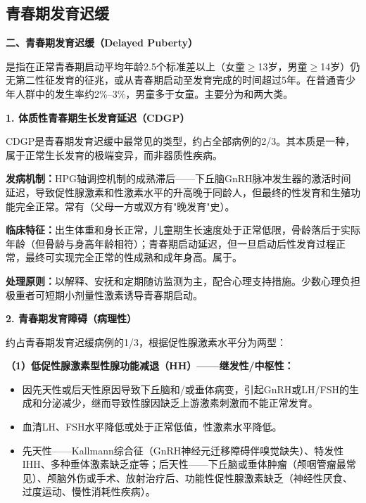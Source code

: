 \subsection{青春期发育迟缓}

\begin{defbox}
\textbf{二、青春期发育迟缓（Delayed Puberty）}

是指在正常青春期启动平均年龄2.5个标准差以上（女童$\geq$13岁，男童$\geq$14岁）仍无第二性征发育的征兆，或从青春期启动至发育完成的时间超过5年。在普通青少年人群中的发生率约2\%--3\%，男童多于女童。主要分为和两大类。
\end{defbox}

\begin{keybox}
\textbf{1. 体质性青春期生长发育延迟（CDGP）}

CDGP是青春期发育迟缓中最常见的类型，约占全部病例的2/3。其本质是一种，属于正常生长发育的极端变异，而非器质性疾病。

\textbf{发病机制：}HPG轴调控机制的成熟滞后——下丘脑GnRH脉冲发生器的激活时间延迟，导致促性腺激素和性激素水平的升高晚于同龄人，但最终的性发育和生殖功能完全正常。常有（父母一方或双方有"晚发育"史）。

\textbf{临床特征：}出生体重和身长正常，儿童期生长速度处于正常低限，骨龄落后于实际年龄（但骨龄与身高年龄相符）；青春期启动延迟，但一旦启动后性发育过程正常，最终可实现完全正常的性成熟和成年身高。属于。

\textbf{处理原则：}以解释、安抚和定期随访监测为主，配合心理支持措施。少数心理负担极重者可短期小剂量性激素诱导青春期启动。

\vspace{6pt}

\textbf{2. 青春期发育障碍（病理性）}

约占青春期发育迟缓病例的1/3，根据促性腺激素水平分为两型：

\textbf{（1）低促性腺激素型性腺功能减退（HH）——继发性/中枢性：}
\begin{itemize}[leftmargin=*]
    \item {}因先天性或后天性原因导致下丘脑和/或垂体病变，引起GnRH或LH/FSH的生成和分泌减少，继而导致性腺因缺乏上游激素刺激而不能正常发育。
    \item {}血清LH、FSH水平降低或处于正常低值，性激素水平降低。
    \item {}先天性——Kallmann综合征（GnRH神经元迁移障碍伴嗅觉缺失）、特发性IHH、多种垂体激素缺乏症等；后天性——下丘脑或垂体肿瘤（颅咽管瘤最常见）、颅脑外伤或手术、放射治疗后、功能性促性腺激素缺乏（神经性厌食、过度运动、慢性消耗性疾病）。
\end{itemize}


\end{keybox}
